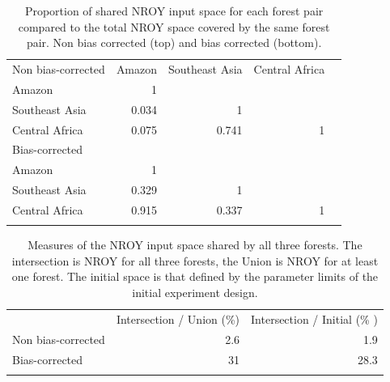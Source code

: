 \documentclass[gmd, manuscript]{copernicus}
\begin{document}
\begin{table}[t]
\caption{Proportion of shared NROY input space for each forest pair compared to the total NROY space covered by the same forest pair. Non bias corrected (top) and bias corrected (bottom).}
\begin{tabular}{lrrrr}
\tophline

Non bias-corrected    & Amazon & Southeast Asia & Central Africa  \\
\middlehline
Amazon                &          1        &             &     \\
Southeast Asia      &        0.034  &           1   &    \\
Central Africa         &    0.075 &  0.741  &   1 \\
\bottomhline

\tophline

Bias-corrected      &   &    & \\
\middlehline
Amazon                &          1        &             &     \\
Southeast Asia      &        0.329  &           1   &    \\
Central Africa         &    0.915 & 0.337  &   1 \\
\bottomhline
\end{tabular}
\belowtable{} %
\label{tab:shared_space}
\end{table}


\begin{table}[t]
\caption{Measures of the NROY input space shared by all three forests. The intersection is NROY for all three forests, the Union is NROY for at least one forest. The initial space is that defined by the parameter limits of the initial experiment design.}
\begin{tabular}{lrr}
\tophline

    & Intersection / Union (\%) & Intersection / Initial (\% ) \\
\middlehline
 Non bias-corrected & 2.6 &   1.9 \\
Bias-corrected  & 31 & 28.3 \\
\bottomhline
\end{tabular}
\belowtable{} %
\label{tab:intersection}
\end{table}
\end{document}
